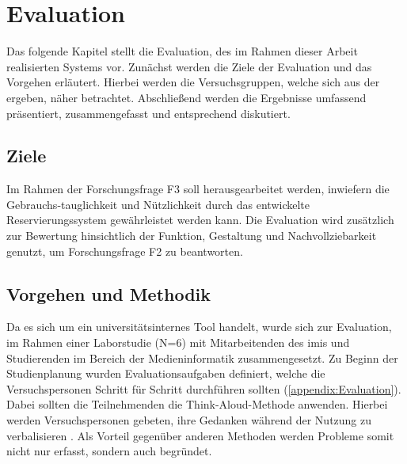 

\chapter{Evaluation}
\label{chapter-evaluation}
Das folgende Kapitel stellt die Evaluation, des im Rahmen dieser Arbeit
realisierten Systems vor. Zunächst werden die Ziele der Evaluation und das
Vorgehen erläutert. Hierbei werden die Versuchsgruppen, welche sich aus der
 ergeben, näher betrachtet. Abschließend werden die
Ergebnisse umfassend präsentiert, zusammengefasst und entsprechend diskutiert.

\section{Ziele}
Im Rahmen der Forschungsfrage F3 soll herausgearbeitet werden, inwiefern die
Gebrauchs-tauglichkeit und Nützlichkeit durch das entwickelte Reservierungssystem
gewährleistet werden kann. Die Evaluation wird zusätzlich zur Bewertung
hinsichtlich der Funktion, Gestaltung und Nachvollziebarkeit genutzt, um
Forschungsfrage F2 zu beantworten.


\section{Vorgehen und Methodik}
Da es sich um ein universitätsinternes Tool handelt, wurde sich zur Evaluation,
im Rahmen einer Laborstudie (N=6) mit Mitarbeitenden des \ac{imis} und
Studierenden im Bereich der Medieninformatik zusammengesetzt. Zu Beginn der
Studienplanung wurden Evaluationsaufgaben definiert, welche die Versuchspersonen
Schritt für Schritt durchführen sollten (\ref{appendix:Evaluation}). Dabei
sollten die Teilnehmenden die Think-Aloud-Methode anwenden. Hierbei werden
Versuchspersonen gebeten, ihre Gedanken während der Nutzung zu verbalisieren
\cite{nielsen_usability_1994}. Als Vorteil gegenüber anderen Methoden werden
Probleme somit nicht nur erfasst, sondern auch begründet\cite{nielsen_think}.

